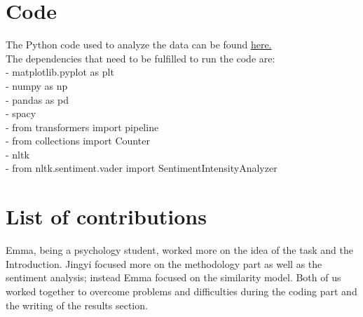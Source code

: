 \section{Code}
The Python code used to analyze the data can be found \href{https://github.com/emmafranchino/nlp_assignments/blob/main/exercise_one/exercise_one_code.ipynb}{here.}\\
The dependencies that need to be fulfilled to run the code are:\\
- matplotlib.pyplot as plt \\
- numpy as np \\
- pandas as pd \\
- spacy \\
- from transformers import pipeline \\
- from collections import Counter \\
- nltk \\
- from nltk.sentiment.vader import SentimentIntensityAnalyzer

\section*{List of contributions}
Emma, being a psychology student, worked more on the idea of the task and the Introduction. Jingyi focused more on the methodology part as well as the sentiment analysis; instead Emma focused on the similarity model. 
Both of us worked together to overcome problems and difficulties during the coding part and the writing of the results section. 